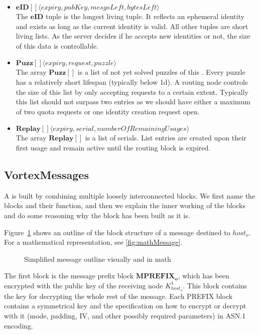 \begin{itemize}
	\item $\mathbf{eID[]}\langle expiry, pubKey, mesgsLeft, bytesLeft \rangle$\\
	The $\mathbf{eID}$ tuple is the longest living tuple. It reflects an ephemeral identity and exists as long as the current identity is valid. All other tuples are short living lists. As the server decides if he accepts new identities or not, the size of this data is controllable. 
	\item $\mathbf{Puzz[]}\langle expiry, request, puzzle \rangle$\\
	The array $\mathbf{Puzz[]}$ is a list of not yet solved puzzles of this . Every puzzle has a relatively short lifespan (typically below 1d). A routing node controls the size of this list by only accepting requests to a certain extent. Typically this list should not surpass two entries as we should have either a maximum of two quota requests or one identity creation request open.
	\item $\mathbf{Replay[]}\langle expiry, serial, numberOfRemainingUsages \rangle$\\
	The array $\mathbf{Replay[]}$ is a list of serials. List entries are created upon their first usage and remain active until the routing block is expired. 
\end{itemize}


\subsection{VortexMessages}\label{sec:vortexMessage}
A \VortexMessage{} is built by combining multiple loosely interconnected blocks. We first name the blocks and their function, and then we explain the inner working of the blocks and do some reasoning why the block has been built as it is. 

Figure~\ref{fig:messageOutline} shows an outline of the block structure of a message destined to $host_o$. For a mathematical representation, see \cref{fig:mathMessage}.

\begin{figure}[ht]
	\centering\resizebox{.95\linewidth}{!}{
		
	}
	\caption{Simplified message outline visually and in math}
	\label{fig:messageOutline}
\end{figure}

The first block is the message prefix block $\mathbf{MPREFIX_o}$, which has been encrypted with the public key of the receiving node $K^1_{host_o}$. This block contains the key for decrypting the whole rest of the message. Each PREFIX block contains a symmetrical key and the specification on how to encrypt or decrypt with it (mode, padding, IV, and other possibly required parameters) in ASN.1 encoding. 

